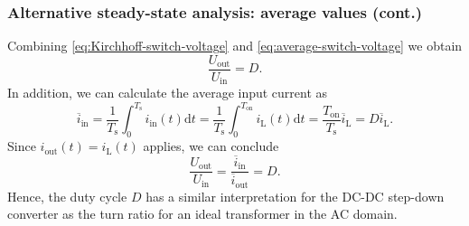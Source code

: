 \begin{frame}
    \frametitle{Alternative steady-state analysis: average values (cont.)}
    Combining \eqref{eq:Kirchhoff-switch-voltage} and \eqref{eq:average-switch-voltage} we obtain
    \begin{equation}
        \frac{U_\mathrm{out}}{U_\mathrm{in}} =  D.
    \end{equation}
    In addition, we can calculate the average input current as
    \begin{equation}
        \overline{i}_\mathrm{in} = \frac{1}{T_\mathrm{s}} \int_{0}^{T_\mathrm{s}} i_\mathrm{in}(t) \mathrm{d}t = \frac{1}{T_\mathrm{s}} \int_{0}^{T_\mathrm{on}} i_\mathrm{L}(t) \mathrm{d}t = \frac{T_\mathrm{on}}{T_\mathrm{s}} \overline{i}_\mathrm{L} = D \overline{i}_\mathrm{L}.
    \end{equation}
    Since $i_\mathrm{out}(t) = i_\mathrm{L}(t)$ applies, we can conclude
    \begin{equation}
        \frac{U_\mathrm{out}}{U_\mathrm{in}} = \frac{\overline{i}_\mathrm{in}}{\overline{i}_\mathrm{out}} = D.
    \end{equation}
    Hence, the duty cycle $D$ has a similar interpretation for the DC-DC step-down converter as the turn ratio for an ideal transformer in the AC domain.
\end{frame}

